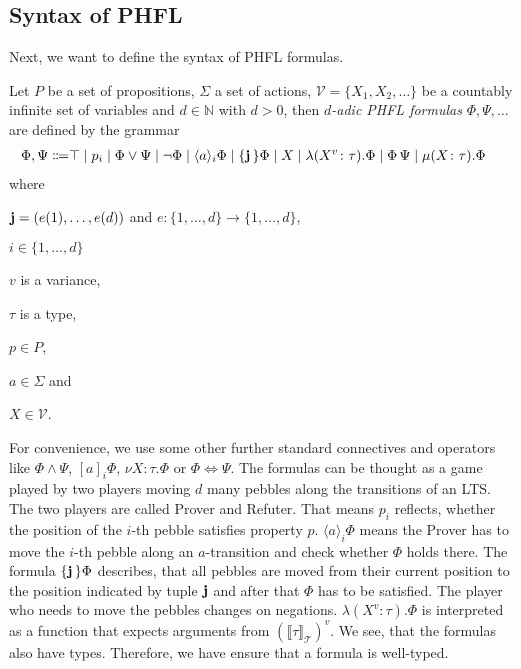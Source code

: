 \subsection{Syntax of PHFL}\label{subsec:phflSyntax}

Next, we want to define the syntax of PHFL formulas.

\begin{definition}
    Let $P$ be a set of propositions, $\Sigma$ a set of actions, $\mathcal{V} = \{X_1, X_2, \dots\}$ be a countably
    infinite
    set of variables and $d \in \mathbb{N}$ with $d >0$, then
    \emph{$d$-adic PHFL formulas} $\Phi, \Psi,\dots$ are defined by the grammar
    \begin{align*}
        \Phi,\Psi\Coloneqq&\top \mid p_i \mid \Phi \vee \Psi \mid \neg \Phi \mid \langle a \rangle_i \Phi \mid
        \{\emph{j}\,\} \Phi \mid X \mid \lambda (X^v\colon\tau).\Phi \mid \Phi\,\Psi\mid  \mu (X\colon\tau).\Phi
    \end{align*}
    where
    \begin{compactitem}
        \item $\emph{j} = (e(1), \dots, e(d))$ and $e: \{1, \dots, d\} \rightarrow \{1, \dots, d\}$,
        \item $i \in \{1, \dots, d\}$
        \item $v$ is a variance,
        \item $\tau$ is a type,
        \item $p \in P$,
        \item $a \in \Sigma$ and
        \item $X \in \mathcal{V}$.
    \end{compactitem}
\end{definition}

For convenience, we use some other further standard connectives and operators like $\Phi \wedge \Psi$, $[a]_i\Phi$, $\nu
X \colon \tau.\Phi$ or $\Phi \Leftrightarrow \Psi$. The formulas can be thought as a game played by two players moving $d$ many pebbles along the transitions of an LTS. The two players
are called Prover and Refuter. That means $p_i$ reflects, whether the position of the $i$-th pebble satisfies
property $p$. $\langle a \rangle_i \Phi$ means the Prover has to move the $i$-th pebble along an $a$-transition and
check whether $\Phi$ holds there. The formula $\{\emph{j}\,\} \Phi$ describes, that all pebbles
are moved from their current position to the position indicated by tuple $\emph{j}$ and after that $\Phi$ has to
be satisfied. The player who needs to move the pebbles changes on negations. $\lambda (X^v\colon\tau).\Phi$ is
interpreted as a function that expects arguments from $(\llbracket\tau\rrbracket_\mathcal{T})^v$. We see, that the
formulas also have types. Therefore, we have ensure that a formula is well-typed.

